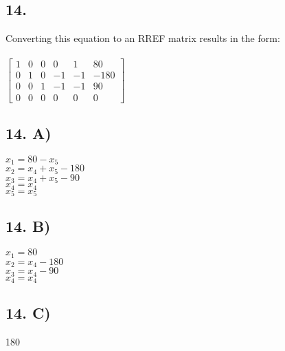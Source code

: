 \documentclass[12]{scrartcl}
\begin{document}
\subsection*{14.}
Converting this equation to an RREF matrix results in the form:\\
\\
$\begin{bmatrix} 1&0&0&0&1&80 \\ 0&1&0&-1&-1&-180 \\ 0&0&1&-1&-1&90 \\ 0&0&0&0&0&0  \end{bmatrix}$
\subsection*{14. A)}
$x_1 = 80 - x_5$\\
$x_2 =x_4 + x_5 -180$\\
$x_3 = x_4 + x_5 -90$\\
$x_4 = x_4$\\
$x_5 = x_5$\\
\subsection*{14. B)}
$x_1 = 80$\\
$x_2 =x_4 -180$\\
$x_3 = x_4  -90$\\
$x_4 = x_4$\\
\subsection*{14. C)}
180
\end{document}
